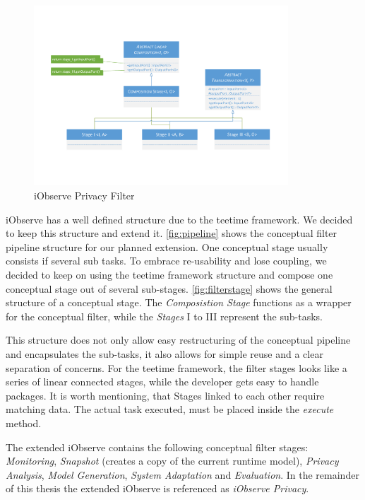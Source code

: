 \begin{figure}[h]
	\centering
	\includegraphics[trim = 20mm 40mm 20mm 35mm, clip, width=0.85\textwidth]{graphs/StageComposition}
	\caption{iObserve Privacy Filter}
	\label{fig:filterstage}
\end{figure}

iObserve has a well defined structure due to the teetime framework. We decided to keep this structure and extend it. \autoref{fig:pipeline} shows the conceptual filter pipeline structure for our planned extension. One conceptual stage usually consists if several sub tasks. To embrace re-usability and lose coupling, we decided to keep on using the teetime framework structure and compose one conceptual stage out of several sub-stages. \autoref{fig:filterstage} shows the general structure of a conceptual stage. The \textit{Composistion Stage} functions as a wrapper for the conceptual filter, while the \textit{Stages} I to III represent the sub-tasks.

This structure does not only allow easy restructuring of the conceptual pipeline and encapsulates the sub-tasks, it also allows for simple reuse and a clear separation of concerns. 
For the teetime framework, the filter stages looks like a series of linear connected stages, while the developer gets easy to handle packages. It is worth mentioning, that Stages linked to each other require matching data. The actual task executed, must be placed inside the \textit{execute} method.

The extended iObserve contains the following conceptual filter stages: \textit{Monitoring}, \textit{Snapshot} (creates a copy of the current runtime model), \textit{Privacy Analysis}, \textit{Model Generation}, \textit{System Adaptation} and \textit{Evaluation}. In the remainder of this thesis the extended iObserve is referenced as \textit{iObserve Privacy}.



